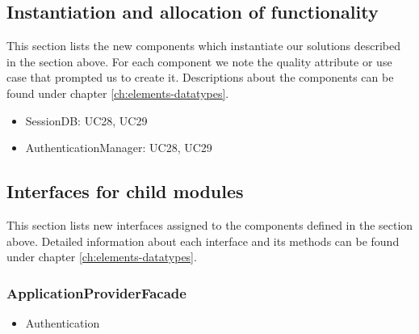 

\subsection{Instantiation and allocation of functionality}
    This section lists the new components which instantiate our solutions
    described in the section above. For each component we note the quality
    attribute or use case that prompted us to create it. Descriptions about
    the components can be found under chapter \ref{ch:elements-datatypes}. \\

    \begin{itemize}
        \item SessionDB: UC28, UC29
        \item AuthenticationManager: UC28, UC29
    \end{itemize}


\subsection{Interfaces for child modules}
    This section lists new interfaces assigned to the components defined
    in the section above. Detailed information about each interface and
    its methods can be found under chapter \ref{ch:elements-datatypes}.

    \subsubsection{ApplicationProviderFacade}
        \begin{itemize}
            \item Authentication
        \end{itemize}

